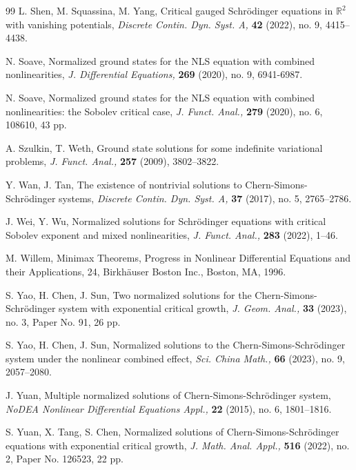 \documentclass[11pt]{amsart}
\numberwithin{equation}{section}
\theoremstyle{definition}
\newcommand{\R}{\mathbb{R}}
\begin{document}
\begin{thebibliography}{99}
L. Shen, M. Squassina, M. Yang, Critical gauged Schr\"{o}dinger equations in $\R^2$ with vanishing potentials,
{\it Discrete Contin. Dyn. Syst. A,} {\bf42} (2022), no. 9, 4415--4438.

 N. Soave, Normalized ground states for the NLS equation with combined nonlinearities,
 {\it  J. Differential Equations,} {\bf269} (2020), no. 9, 6941-6987.

 N. Soave, Normalized ground states for the NLS equation with combined nonlinearities: the Sobolev critical case,
 {\it J. Funct. Anal.,} {\bf279} (2020), no. 6, 108610, 43 pp.

A. Szulkin, T. Weth, Ground state solutions for some indefinite variational problems,
 {\it J. Funct. Anal.,} {\bf257} (2009), 3802--3822.


Y. Wan, J. Tan, The existence of nontrivial solutions to Chern-Simons-Schr\"{o}dinger systems,
{\it Discrete Contin. Dyn. Syst. A,} {\bf37} (2017), no. 5, 2765--2786.

J. Wei, Y. Wu, Normalized solutions for Schr\"{o}dinger equations with critical Sobolev exponent
and mixed nonlinearities, {\it J. Funct. Anal.,} {\bf283} (2022), 1--46.

M. Willem, Minimax Theorems, Progress in Nonlinear Differential Equations and their Applications, 24, Birkh\"{a}user Boston Inc., Boston, MA,
1996.

S. Yao, H. Chen, J. Sun, Two normalized solutions for the Chern-Simons-Schr\"{o}dinger system with exponential critical growth,
{\it J. Geom. Anal.,} {\bf33} (2023), no. 3, Paper No. 91, 26 pp.

S. Yao, H. Chen, J. Sun, Normalized solutions to the Chern-Simons-Schr\"{o}dinger system under the nonlinear combined effect,
{\it Sci. China Math.,} {\bf66} (2023), no. 9, 2057--2080.

J. Yuan, Multiple normalized solutions of Chern-Simons-Schr\"{o}dinger system,
{\it NoDEA Nonlinear Differential Equations Appl.,} {\bf22} (2015), no. 6, 1801--1816.

S. Yuan, X. Tang, S. Chen, Normalized solutions of Chern-Simons-Schr\"{o}dinger equations with exponential critical growth,
 {\it J. Math. Anal. Appl.,} {\bf516} (2022), no. 2, Paper No. 126523, 22 pp.

\end{thebibliography}

\bigskip
\end{document}
